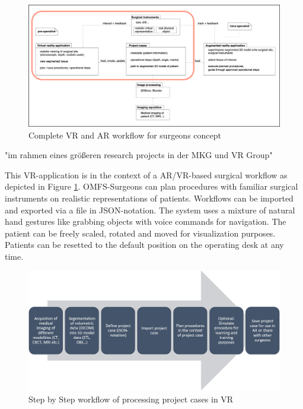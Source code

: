 \begin{figure}[ht!]
    \centering
    \includegraphics[width=\linewidth]{images/project_plan.png}
    \caption{\label{fig::ProjectPlan} Complete VR and AR workflow for surgeons concept}
\end{figure}

"im rahmen eines größeren research projects in der MKG und VR Group"

This VR-application is in the context of a AR/VR-based surgical workflow as depicted in Figure \ref{fig::ProjectPlan}.
OMFS-Surgeons can plan procedures with familiar surgical instruments on realistic representations of patients.
Workflows can be imported and exported via a file in JSON-notation.
The system uses a mixture of natural hand gestures like grabbing objects with voice commands for navigation.
The patient can be freely scaled, rotated and moved for visualization purposes.
Patients can be resetted to the default position on the operating desk at any time.

\begin{figure}[ht!]
    \centering
    \includegraphics[width=\linewidth]{images/implementation/workflow.png}
    \caption{\label{fig::ImplementationWorkflow}Step by Step workflow of processing project cases in VR}
\end{figure}

